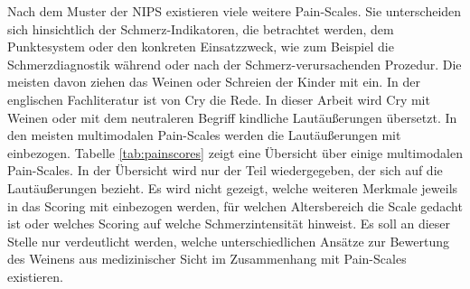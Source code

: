 Nach dem Muster der NIPS existieren viele weitere Pain-Scales. Sie unterscheiden sich hinsichtlich der Schmerz-Indikatoren, die betrachtet werden, dem Punktesystem oder den konkreten Einsatzzweck, wie zum Beispiel die Schmerzdiagnostik während oder nach der Schmerz-verursachenden Prozedur. Die meisten davon ziehen das Weinen oder Schreien der Kinder mit ein. In der englischen Fachliteratur ist von \glqq Cry\grqq{} die Rede.\cite[S. 97 - 98]{painInNeonates} In dieser Arbeit wird \glqq Cry\grqq{} mit \glqq Weinen\grqq{} oder mit dem neutraleren Begriff \glqq kindliche Lautäußerungen\grqq{} übersetzt. In den meisten multimodalen Pain-Scales werden die Lautäußerungen mit einbezogen. Tabelle \ref{tab:painscores} zeigt eine Übersicht über einige multimodalen Pain-Scales. In der Übersicht wird nur der Teil wiedergegeben, der sich auf die Lautäußerungen bezieht. Es wird nicht gezeigt, welche weiteren Merkmale jeweils in das Scoring mit einbezogen werden, für welchen Altersbereich die Scale gedacht ist oder welches Scoring auf welche Schmerzintensität hinweist. Es soll an dieser Stelle nur verdeutlicht werden, welche unterschiedlichen Ansätze zur Bewertung des Weinens aus medizinischer Sicht im Zusammenhang mit Pain-Scales existieren. 

